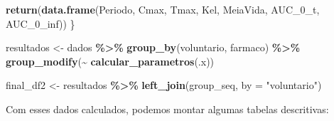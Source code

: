 \documentclass[
]{article}
\newenvironment{Shaded}{\begin{snugshade}}{\end{snugshade}}
\newcommand{\AttributeTok}[1]{\textcolor[rgb]{0.13,0.29,0.53}{#1}}
\newcommand{\FunctionTok}[1]{\textcolor[rgb]{0.13,0.29,0.53}{\textbf{#1}}}
\newcommand{\NormalTok}[1]{#1}
\newcommand{\OtherTok}[1]{\textcolor[rgb]{0.56,0.35,0.01}{#1}}
\newcommand{\SpecialCharTok}[1]{\textcolor[rgb]{0.81,0.36,0.00}{\textbf{#1}}}
\newcommand{\StringTok}[1]{\textcolor[rgb]{0.31,0.60,0.02}{#1}}
\begin{document}
\begin{Shaded}
\begin{Highlighting}[]
  \FunctionTok{return}\NormalTok{(}\FunctionTok{data.frame}\NormalTok{(Periodo, Cmax, Tmax, Kel, MeiaVida, AUC\_0\_t, AUC\_0\_inf))}
\NormalTok{\}}

\NormalTok{resultados }\OtherTok{\textless{}{-}}\NormalTok{ dados }\SpecialCharTok{\%\textgreater{}\%}
  \FunctionTok{group\_by}\NormalTok{(voluntario, farmaco) }\SpecialCharTok{\%\textgreater{}\%}
  \FunctionTok{group\_modify}\NormalTok{(}\SpecialCharTok{\textasciitilde{}} \FunctionTok{calcular\_parametros}\NormalTok{(.x))}

\NormalTok{final\_df2 }\OtherTok{\textless{}{-}}\NormalTok{ resultados }\SpecialCharTok{\%\textgreater{}\%}
  \FunctionTok{left\_join}\NormalTok{(group\_seq, }\AttributeTok{by =} \StringTok{"voluntario"}\NormalTok{)}
\end{Highlighting}
\end{Shaded}

Com esses dados calculados, podemos montar algumas tabelas descritivas:
\end{document}
